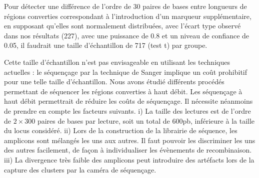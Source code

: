 Pour détecter une différence de l'ordre de \num{30} paires de bases entre
longueurs de régions converties correspondant à l'introduction d'un marqueur
supplémentaire, en supposant qu'elles sont normalement distribuées, avec l'écart
type observé dans nos résultats (\num{227}), avec une puissance de \num{0.8} et
un niveau de confiance de \num{0.05}, il faudrait une taille d'échantillon de
\num{717} (test \textrm{t}) par groupe.

Cette taille d'échantillon n'est pas envisageable en utilisant les techniques
actuelles : le séquençage par la technique de Sanger implique un coût prohibitif
pour une telle taille d'échantillon. Nous avons étudié différents procédés
permettant de séquencer les régions converties à haut débit. Les séquençage à
haut débit permettrait de réduire les coûts de séquençage. Il nécessite
néanmoins de prendre en compte les facteurs suivants. i) La taille des lectures
est de l'ordre de \(2 \times 300\) paires de bases par lecture, soit un total de
\(600\)pb, inférieure à la taille du locus considéré. ii) Lors de la
construction de la librairie de séquence, les amplicons sont mélangés les uns
aux autres. Il faut pouvoir les discriminer les uns des autres facilement, de
façon à individualiser les évènements de recombinaison. iii) La divergence très
faible des amplicons peut introduire des artéfacts lors de la capture des
clusters par la caméra de séquençage.







\afterpage{\blankpage}